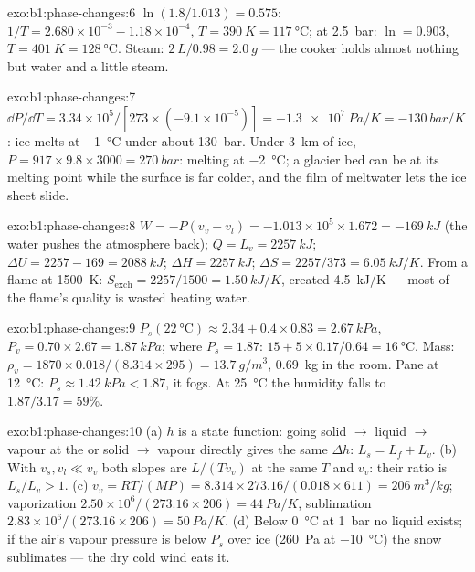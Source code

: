 \begin{solution}{exo:b1:phase-changes:6}
$\ln(1.8/1.013) = 0.575$: $1/T = 2.680 \times 10^{-3} - 1.18 \times 10^{-4}$,
$T = \qty{390}{K} = \qty{117}{\degreeCelsius}$; at \qty{2.5}{bar}: $\ln = 0.903$,
$T = \qty{401}{K} = \qty{128}{\degreeCelsius}$. Steam: $\qty{2}{L}/0.98 =
\qty{2.0}{g}$ --- the cooker holds almost nothing but water and a little
steam.
\end{solution}

\begin{solution}{exo:b1:phase-changes:7}
$\dd P/\dd T = 3.34 \times 10^5/[273 \times (-9.1 \times 10^{-5})] = \qty{-1.3e7}{Pa/K}
= \qty{-130}{bar/K}$: ice melts at \qty{-1}{\degreeCelsius} under about
\qty{130}{bar}. Under \qty{3}{km} of ice, $P = 917 \times 9.8 \times 3000 =
\qty{270}{bar}$: melting at \qty{-2}{\degreeCelsius}; a glacier bed can be at
its melting point while the surface is far colder, and the film of
meltwater lets the ice sheet slide.
\end{solution}

\begin{solution}{exo:b1:phase-changes:8}
$W = -P(v_v - v_l) = -1.013 \times 10^5 \times 1.672 = \qty{-169}{kJ}$ (the water
pushes the atmosphere back); $Q = L_v = \qty{2257}{kJ}$; $\Delta U = 2257 - 169
= \qty{2088}{kJ}$; $\Delta H = \qty{2257}{kJ}$; $\Delta S = 2257/373 = \qty{6.05}{kJ/K}$.
From a flame at \qty{1500}{K}: $S_{\mathrm{exch}} = 2257/1500 = \qty{1.50}{kJ/K}$,
created \qty{4.5}{kJ/K} --- most of the flame's quality is wasted heating
water.
\end{solution}

\begin{solution}{exo:b1:phase-changes:9}
$P_s(\qty{22}{\degreeCelsius}) \approx 2.34 + 0.4 \times 0.83 = \qty{2.67}{kPa}$,
$P_v = 0.70 \times 2.67 = \qty{1.87}{kPa}$;  where $P_s = 1.87$: $15 +
5 \times 0.17/0.64 = \qty{16}{\degreeCelsius}$. Mass: $\rho_v = 1870 \times 0.018/
(8.314 \times 295) = \qty{13.7}{g/m^3}$, \qty{0.69}{kg} in the room. Pane at
\qty{12}{\degreeCelsius}: $P_s \approx \qty{1.42}{kPa} < 1.87$, it fogs. At
\qty{25}{\degreeCelsius} the humidity falls to $1.87/3.17 = 59\%$.
\end{solution}

\begin{solution}{exo:b1:phase-changes:10}
(a) $h$ is a state function: going solid $\to$ liquid $\to$ vapour at the
 or solid $\to$ vapour directly gives the same $\Delta h$:
$L_s = L_f + L_v$. (b) With $v_s, v_l \ll v_v$ both slopes are $L/(Tv_v)$ at
the same $T$ and $v_v$: their ratio is $L_s/L_v > 1$. (c) $v_v = RT/(MP) =
8.314 \times 273.16/(0.018 \times 611) = \qty{206}{m^3/kg}$; vaporization
$2.50 \times 10^6/(273.16 \times 206) = \qty{44}{Pa/K}$, sublimation $2.83 \times 10^6/
(273.16 \times 206) = \qty{50}{Pa/K}$. (d) Below \qty{0}{\degreeCelsius} at
\qty{1}{bar} no liquid exists; if the air's vapour pressure is below
$P_s$ over ice (\qty{260}{Pa} at \qty{-10}{\degreeCelsius}) the snow
sublimates --- the dry cold wind eats it.
\end{solution}

